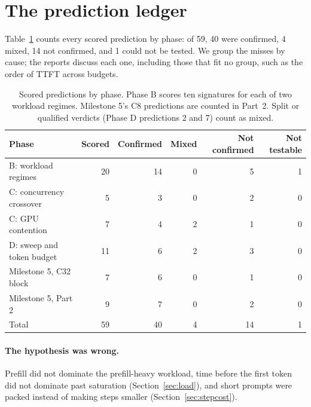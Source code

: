 \section{The prediction ledger}
\label{sec:ledger}

Table~\ref{tab:ledger} counts every scored prediction by phase: of 59, 40 were
confirmed, 4 mixed, 14 not confirmed, and 1 could not be tested. We group the misses by
cause; the reports discuss each one, including those that fit no group, such as the
order of TTFT across budgets.

\begin{table}[t]
  \centering
  \caption{Scored predictions by phase. Phase B scores ten signatures for each of two
    workload regimes. Milestone 5's C8 predictions are counted in Part~2. Split or
    qualified verdicts (Phase D predictions 2 and 7) count as mixed.}
  \label{tab:ledger}
  \begin{tabular}{lrrrrr}
    \toprule
    Phase & Scored & Confirmed & Mixed & Not confirmed & Not testable \\
    \midrule
    B: workload regimes          & 20 & 14 & 0 & 5 & 1 \\
    C: concurrency crossover     & 5  & 3  & 0 & 2 & 0 \\
    C: GPU contention            & 7  & 4  & 2 & 1 & 0 \\
    D: sweep and token budget    & 11 & 6  & 2 & 3 & 0 \\
    Milestone 5, C32 block       & 7  & 6  & 0 & 1 & 0 \\
    Milestone 5, Part 2          & 9  & 7  & 0 & 2 & 0 \\
    \midrule
    Total                        & 59 & 40 & 4 & 14 & 1 \\
    \bottomrule
  \end{tabular}
\end{table}

\paragraph{The hypothesis was wrong.}
Prefill did not dominate the prefill-heavy workload, time before the first token did
not dominate past saturation (Section~\ref{sec:load}), and short prompts were packed
instead of making steps smaller (Section~\ref{sec:stepcost}).

